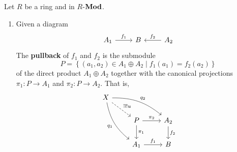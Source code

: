 \begin{definition}
    Let $R$ be a ring and in $R$-$\mathbf{Mod}$.
    \begin{enumerate}
        \item
              Given a diagram
              \begin{equation*}
                  \begin{tikzcd}
                      A_1 \arrow[r,"f_1"]& B&\arrow[l,"f_2"'] A_2
                  \end{tikzcd}
              \end{equation*}
              The \textbf{pullback} of $f_1$ and $f_2$ is the submodule
              \begin{equation*}
                  P=\left\{(a_1, a_2) \in A_1 \oplus A_2 \mid f_1(a_1)=f_2(a_2)\right\}
              \end{equation*}
              of the direct product $A_1 \oplus A_2$ together with the canonical projections $\pi_1: P \rightarrow A_1$ and $\pi_2: P \rightarrow A_2$.
              That is,
              \begin{equation*}
                  \begin{tikzcd}
                      X \arrow[ddr,bend right=20,"q_1"']\arrow[drr,bend left=20,"q_2"]\arrow[rd,dashed,"\exists! u"]& &\\
                      &P \arrow[d,"\pi_1"]\arrow[r,"\pi_2"]&  A_2\arrow[d,"f_2"]\\
                      &A_1\arrow[r,"f_1"]&  B\\
                  \end{tikzcd}
              \end{equation*}


\end{enumerate}
\end{definition}

